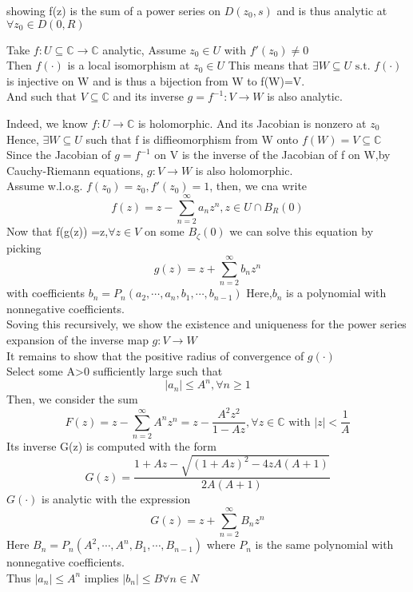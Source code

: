 showing f(z) is the sum of a power series on $ D(z_0,s)  $ and is thus analytic at $ \forall z_0\in D(0,R) $
\begin{definition}{}
 Take $ f:U\subseteq \mathbb{C}\rightarrow\mathbb{C}  $ analytic, Assume $ z_0\in U $ with $ f'(z_0 )\neq0$
 \\Then $ f(\cdot) $ is a local isomorphism at $ z_0\in U $ This means that $ \exists W\subseteq U\text{ s.t. }f(\cdot)  $ is injective on W and is thus a bijection from W to f(W)=V.
 \\And such that $ V\subseteq \mathbb{C} $ and its inverse $ g=f^{-1}:V\rightarrow W $ is also analytic.    
\end{definition}  
Indeed, we know $ f:U\rightarrow \mathbb{C} $ is holomorphic. And its Jacobian is nonzero at $ z_0 $
\\Hence, $ \exists W\subseteq U $ such that f is diffieomorphism from W onto $ f(W)=V\subseteq \mathbb{C} $ 
\\Since the Jacobian of $ g=f^{-1} $ on V is the inverse of the Jacobian of f on W,by Cauchy-Riemann equations, $ g:V\rightarrow W $  is also holomorphic. 
\\Assume w.l.o.g. $ f(z_0)=z_0,f'(z_0)=1 $, then, we cna write
$$
    f(z)=z-\sum_{n=2}^{\infty}a_n{z}^n,z\in U\cap B_R(0)
$$  
Now that f(g(z)) =z,$ \forall z\in V $ on some $ B_\zeta(0) $ we can solve this equation by picking
$$
    g(z)=z+\sum_{n=2}^{\infty}b_n{z}^n
$$   
with coefficients $ b_n=P_n(a_2,\cdots,a_n,b_1,\cdots,b_{n-1}) $ Here,$ b_n $ is a polynomial with nonnegative coefficients.
\\Soving this recursively, we show the existence and uniqueness for the power series expansion of the inverse map $ g:V\rightarrow W $
\\It remains to show that the positive radius of convergence of $g(\cdot)$ 
\\Select some A>0 sufficiently large such that$$
    |a_n|\leq A^n,\forall n\geq1 
$$ 
Then, we consider the sum$$
    F(z)=z-\sum_{n=2}^{\infty}A^nz^n=z-\frac{A^2z^2}{1-Az},\forall z\in\mathbb{C} \text{ with }|z|<\frac{1}{A}
$$ 
Its inverse G(z) is computed with the form
$$
    G(z)=\frac{1+Az-\sqrt{(1+Az)^2-4zA(A+1)}}{2A(A+1)}
$$ 
$ G(\cdot) $ is analytic with the expression 
$$
    G(z)=z+\sum_{n=2}^{\infty}B_nz^n
$$ 
Here $ B_n=P_n(A^2,\cdots,A^n,B_1,\cdots,B_{n-1}) $ where $ P_n $ is the same polynomial with nonnegative coefficients.
\\Thus $ |a_n|\leq A^n $ implies $ |b_n|\leq B \forall n\in N $   
